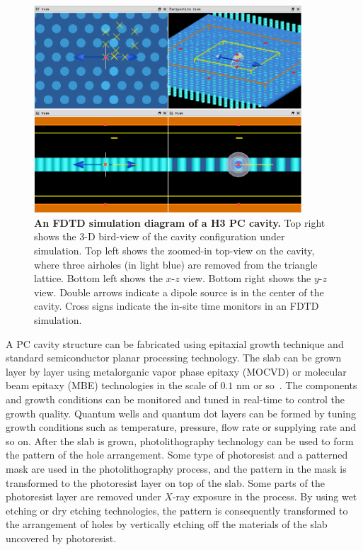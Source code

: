 \begin{figure}[htp]%
\centering
\begin{center}
\includegraphics[width=10cm]{./Figs/FDTDsimulation}%
\end{center}
\caption[An FDTD simulation diagram of a H3 PC cavity.]{\textbf{An FDTD simulation diagram of a H3 PC cavity.} Top right shows the 3-D bird-view of the cavity configuration under simulation. Top left shows the zoomed-in top-view on the cavity, where three airholes (in light blue) are removed from the triangle lattice. Bottom left shows the $x$-$z$ view. Bottom right shows the $y$-$z$ view. Double arrows indicate a dipole source is in the center of the cavity. Cross signs indicate the in-site time monitors in an FDTD simulation.}
\label{FDTDsimulation}
\end{figure}


A PC cavity structure can be fabricated using epitaxial growth technique and standard semiconductor planar processing technology. The slab can be grown layer by layer using metalorganic vapor phase epitaxy (MOCVD) or molecular beam epitaxy (MBE) technologies in the scale of $0.1$ nm or so~\cite{III2009}. The components and growth conditions can be monitored and tuned in real-time to control the growth quality. Quantum wells and quantum dot layers can be formed by tuning growth conditions such as temperature, pressure, flow rate or supplying rate and so on. After the slab is grown, photolithography technology can be used to form the pattern of the hole arrangement. Some type of photoresist and a patterned mask are used in the photolithography process, and the pattern in the mask is transformed to the photoresist layer on top of the slab. Some parts of the photoresist layer are removed under $X$-ray exposure in the process. By using wet etching or dry etching technologies, the pattern is consequently transformed to the arrangement of holes by vertically etching off the materials of the slab uncovered by photoresist.


